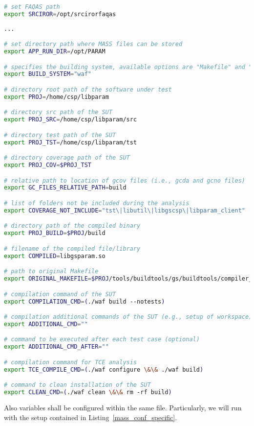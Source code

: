 \begin{lstlisting}[language=bash, label=mass_conf_single, caption=\MASS variables. Excerpt of mass\_conf.sh file.]
# set FAQAS path
export SRCIROR=/opt/srcirorfaqas
                                                     
...

# set directory path where MASS files can be stored
export APP_RUN_DIR=/opt/PARAM

# specifies the building system, available options are "Makefile" and "waf"
export BUILD_SYSTEM="waf"

# directory root path of the software under test
export PROJ=/home/csp/libparam

# directory src path of the SUT
export PROJ_SRC=/home/csp/libparam/src

# directory test path of the SUT
export PROJ_TST=/home/csp/libparam/tst

# directory coverage path of the SUT
export PROJ_COV=$PROJ_TST

# relative path to location of gcov files (i.e., gcda and gcno files)
export GC_FILES_RELATIVE_PATH=build

# list of folders not be included during the analysis
export COVERAGE_NOT_INCLUDE="tst\|libutil\|libgscsp\|libparam_client"

# directory path of the compiled binary
export PROJ_BUILD=$PROJ/build

# filename of the compiled file/library
export COMPILED=libgsparam.so

# path to original Makefile
export ORIGINAL_MAKEFILE=$PROJ/tools/buildtools/gs/buildtools/compiler_settings.json

# compilation command of the SUT
export COMPILATION_CMD=(./waf build --notests)

# compilation additional commands of the SUT (e.g., setup of workspace) (optional)
export ADDITIONAL_CMD=""

# command to be executed after each test case (optional)
export ADDITIONAL_CMD_AFTER=""

# compilation command for TCE analysis
export TCE_COMPILE_CMD=(./waf configure \&\& ./waf build)

# command to clean installation of the SUT
export CLEAN_CMD=(./waf clean \&\& rm -rf build)
\end{lstlisting}

Also \MASS variables shall be configured within the same file. Particularly, we will run \MASS with the setup contained in Listing~\ref{mass_conf_specific}. 

